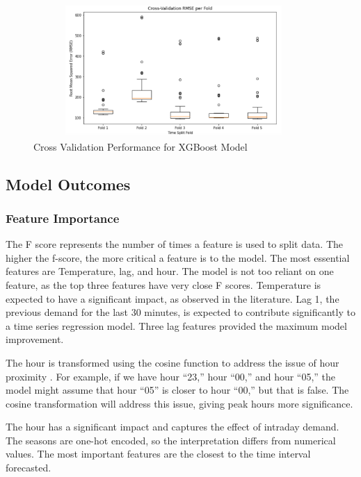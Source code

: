 \documentclass[mstat,12pt]{unswthesis}
\begin{document}
\begin{figure}[H]
\centering
\includegraphics[width=0.95\textwidth, height=5cm]{xg_validation.png}
\caption{Cross Validation Performance for XGBoost Model}\label{xg_validation}
\end{figure}

\subsection{Model Outcomes}\label{model-outcomes}

\subsubsection{Feature Importance}\label{feature-importance}

The F score represents the number of times a feature is used to split
data. The higher the f-score, the more critical a feature is to the
model. The most essential features are Temperature, lag, and hour. The
model is not too reliant on one feature, as the top three features have
very close F scores. Temperature is expected to have a significant
impact, as observed in the literature. Lag 1, the previous demand for
the last 30 minutes, is expected to contribute significantly to a time
series regression model. Three lag features provided the maximum model
improvement.

The hour is transformed using the cosine function to address the issue
of hour proximity \cite{avanwyk_2022_encoding}. For example, if we have
hour ``23,'' hour ``00,'' and hour ``05,'' the model might assume that
hour ``05'' is closer to hour ``00,'' but that is false. The cosine
transformation will address this issue, giving peak hours more
significance.

The hour has a significant impact and captures the effect of intraday
demand. The seasons are one-hot encoded, so the interpretation differs
from numerical values. The most important features are the closest to
the time interval forecasted.
\end{document}
